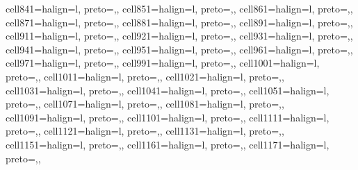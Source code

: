 \begin{table}
\begin{talltblr}[         %
caption={Technology Adoption Models:  Germany},
note{}={* p \num{< 0.1}, ** p \num{< 0.05}, *** p \num{< 0.01}},
note{ }={* p < 0.1, ** p < 0.05, *** p < 0.01},
]
{cell{84}{1}={}{halign=l, preto={\hspace{1em}},},
cell{85}{1}={}{halign=l, preto={\hspace{1em}},},
cell{86}{1}={}{halign=l, preto={\hspace{1em}},},
cell{87}{1}={}{halign=l, preto={\hspace{1em}},},
cell{88}{1}={}{halign=l, preto={\hspace{1em}},},
cell{89}{1}={}{halign=l, preto={\hspace{1em}},},
cell{91}{1}={}{halign=l, preto={\hspace{1em}},},
cell{92}{1}={}{halign=l, preto={\hspace{1em}},},
cell{93}{1}={}{halign=l, preto={\hspace{1em}},},
cell{94}{1}={}{halign=l, preto={\hspace{1em}},},
cell{95}{1}={}{halign=l, preto={\hspace{1em}},},
cell{96}{1}={}{halign=l, preto={\hspace{1em}},},
cell{97}{1}={}{halign=l, preto={\hspace{1em}},},
cell{99}{1}={}{halign=l, preto={\hspace{1em}},},
cell{100}{1}={}{halign=l, preto={\hspace{1em}},},
cell{101}{1}={}{halign=l, preto={\hspace{1em}},},
cell{102}{1}={}{halign=l, preto={\hspace{1em}},},
cell{103}{1}={}{halign=l, preto={\hspace{1em}},},
cell{104}{1}={}{halign=l, preto={\hspace{1em}},},
cell{105}{1}={}{halign=l, preto={\hspace{1em}},},
cell{107}{1}={}{halign=l, preto={\hspace{1em}},},
cell{108}{1}={}{halign=l, preto={\hspace{1em}},},
cell{109}{1}={}{halign=l, preto={\hspace{1em}},},
cell{110}{1}={}{halign=l, preto={\hspace{1em}},},
cell{111}{1}={}{halign=l, preto={\hspace{1em}},},
cell{112}{1}={}{halign=l, preto={\hspace{1em}},},
cell{113}{1}={}{halign=l, preto={\hspace{1em}},},
cell{115}{1}={}{halign=l, preto={\hspace{1em}},},
cell{116}{1}={}{halign=l, preto={\hspace{1em}},},
cell{117}{1}={}{halign=l, preto={\hspace{1em}},},
}
\end{talltblr}
\end{table}

